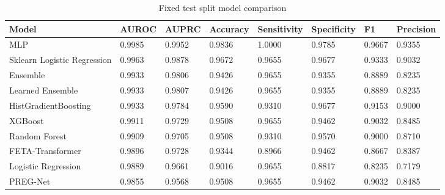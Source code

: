\begin{table}[ht]
\centering
\caption{Fixed test split model comparison}
\label{tab:model-comparison}
\begin{tabular}{llllllll}
\hline
Model & AUROC & AUPRC & Accuracy & Sensitivity & Specificity & F1 & Precision \\
\hline
MLP & 0.9985 & 0.9952 & 0.9836 & 1.0000 & 0.9785 & 0.9667 & 0.9355 \\
Sklearn Logistic Regression & 0.9963 & 0.9878 & 0.9672 & 0.9655 & 0.9677 & 0.9333 & 0.9032 \\
Ensemble & 0.9933 & 0.9806 & 0.9426 & 0.9655 & 0.9355 & 0.8889 & 0.8235 \\
Learned Ensemble & 0.9933 & 0.9807 & 0.9426 & 0.9655 & 0.9355 & 0.8889 & 0.8235 \\
HistGradientBoosting & 0.9933 & 0.9784 & 0.9590 & 0.9310 & 0.9677 & 0.9153 & 0.9000 \\
XGBoost & 0.9911 & 0.9729 & 0.9508 & 0.9655 & 0.9462 & 0.9032 & 0.8485 \\
Random Forest & 0.9909 & 0.9705 & 0.9508 & 0.9310 & 0.9570 & 0.9000 & 0.8710 \\
FETA-Transformer & 0.9896 & 0.9728 & 0.9344 & 0.8966 & 0.9462 & 0.8667 & 0.8387 \\
Logistic Regression & 0.9889 & 0.9661 & 0.9016 & 0.9655 & 0.8817 & 0.8235 & 0.7179 \\
PREG-Net & 0.9855 & 0.9568 & 0.9508 & 0.9655 & 0.9462 & 0.9032 & 0.8485 \\
\hline
\end{tabular}
\end{table}
